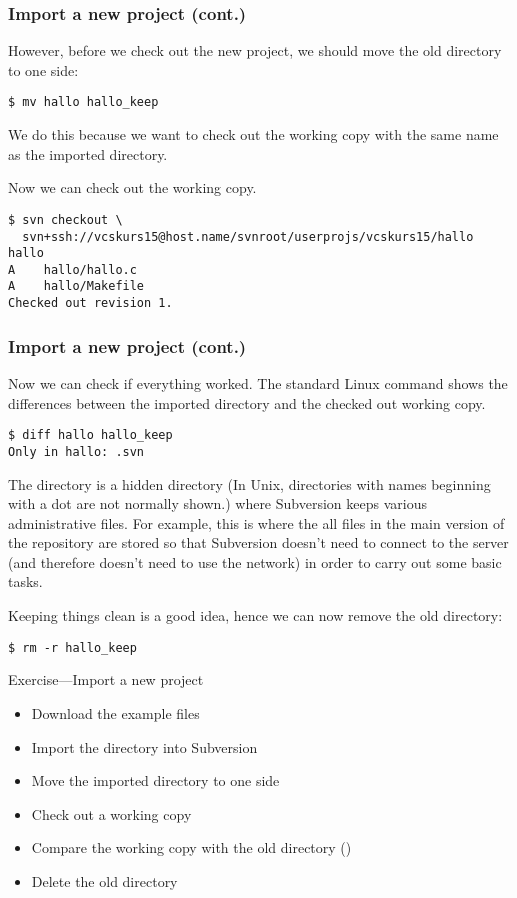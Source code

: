 \begin{frame}[fragile]
\frametitle{Import a new project (cont.)}
\linuxframe
However, before we check out the new project, we should move the old
 directory to one side:
\begin{lstlisting}
$ mv hallo hallo_keep
\end{lstlisting}
We do this because we want to check out the working copy with the same name
as the imported directory.

Now we can check out the working copy.
\begin{lstlisting}[basicstyle=\tiny\ttfamily\color{black}]
$ svn checkout \
  svn+ssh://vcskurs15@host.name/svnroot/userprojs/vcskurs15/hallo hallo
A    hallo/hallo.c
A    hallo/Makefile
Checked out revision 1.
\end{lstlisting}

\end{frame}

\begin{frame}[fragile]
\frametitle{Import a new project (cont.)}
\linuxframe

Now we can check if everything worked.  The standard Linux command
\ttalert{diff} shows the differences between the imported directory and the
checked out working copy.
\begin{lstlisting}
$ diff hallo hallo_keep
Only in hallo: .svn
\end{lstlisting}

The  directory is a hidden directory (In Unix, directories
with names beginning with a dot are not normally shown.) where Subversion
keeps various administrative files.  For example, this is where the all
files in the main version of the repository are stored so that Subversion
doesn't need to connect to the server (and therefore doesn't need to use the
network) in order to carry out some basic tasks.

Keeping things clean is a good idea, hence we can now remove the old
directory:
\begin{lstlisting}
$ rm -r hallo_keep
\end{lstlisting}

\end{frame}

\begin{frame}{Exercise---Import a new project}
\begin{itemize}
\item Download the  example files
\item Import the directory into Subversion
\item Move the imported directory to one side
\item Check out a working copy
\item Compare the working copy with the old directory ()
\item Delete the old directory
\end{itemize}
\end{frame}

